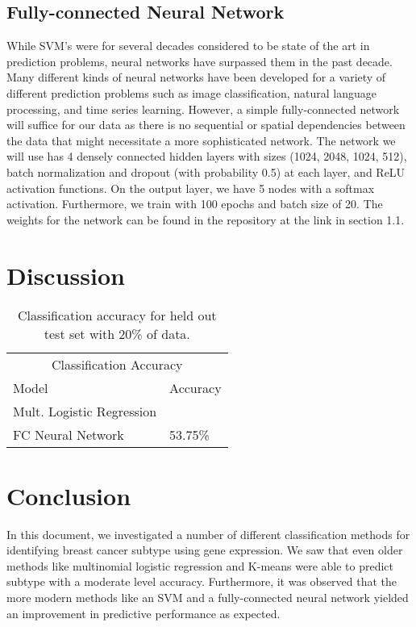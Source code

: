 \documentclass{article}
\begin{document}
\subsection{Fully-connected Neural Network}
While SVM's were for several decades considered to be state of the art in prediction problems, neural networks have surpassed them in the past decade. Many different kinds of neural networks have been developed for a variety of different prediction problems such as image classification, natural language processing, and time series learning. However, a simple fully-connected network will suffice for our data as there is no sequential or spatial dependencies between the data that might necessitate a more sophisticated network.
\newline\newline The network we will use has 4 densely connected hidden layers with sizes (1024, 2048, 1024, 512), batch normalization and dropout (with probability 0.5) at each layer, and ReLU activation functions. On the output layer, we have 5 nodes with a softmax activation. Furthermore, we train with 100 epochs and batch size of 20. The weights for the network can be found in the repository at the link in section 1.1.

\section{Discussion}
\begin{table}[t]
  \caption{Classification accuracy for held out test set with 20\% of data.}
  \label{class_acc}
  \centering
  \begin{tabular}{ll}
    \toprule
    \multicolumn{2}{c}{Classification Accuracy}                   \\
    \cmidrule{1-2}
    Model  & Accuracy  \\
    \midrule
     Mult. Logistic Regression & \\
	 FC Neural Network & 53.75\% \\
    \bottomrule
  \end{tabular}
\end{table}

\section{Conclusion}
In this document, we investigated a number of different classification methods for identifying breast cancer subtype using gene expression. We saw that even older methods like multinomial logistic regression and K-means were able to predict subtype with a moderate level accuracy. Furthermore, it was observed that the more modern methods like an SVM and a fully-connected neural network yielded an improvement in predictive performance as expected.
\end{document}

